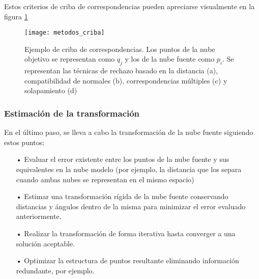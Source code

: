 Estos criterios de criba de correspondencias pueden apreciarse visualmente en la figura \ref{fig:metodos_criba}
\begin{figure}
\centering
\texttt{[image: metodos\_criba]}
\caption{Ejemplo de criba de correspondencias. Los puntos de la nube objetivo se representan como $q_j$ y los de la nube fuente como $p_i$. Se representan las técnicas de rechazo basado en la distancia (a), compatibilidad de normales (b), correspondencias múltiples (c) y solapamiento (d)}\label{fig:metodos_criba}
\end{figure}

\subsubsection{Estimación de la transformación}
En el último paso, se lleva a cabo la transformación de la nube fuente siguiendo estos puntos\cite{paper_registration}:
\begin{itemize}
\item[•]Evaluar el error existente entre los puntos de la nube fuente y sus equivalentes en la nube modelo (por ejemplo, la distancia que los separa cuando ambas nubes se representan en el mismo espacio)
\item[•]Estimar una transformación rígida de la nube fuente conservando distancias y ángulos dentro de la misma para minimizar el error evaluado anteriormente.
\item[•]Realizar la transformación de forma iterativa hasta converger a una solución aceptable.
\item[•]Optimizar la estructura de puntos resultante eliminando información redundante, por ejemplo.
\end{itemize}


